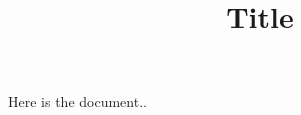 \documentclass{article}
\title{Title}
\begin{document}
\maketitle

Here is the document..
\end{document}
